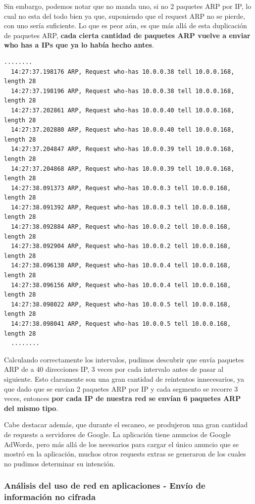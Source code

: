 Sin embargo, podemos notar que no manda uno, si no 2 paquetes ARP por IP, lo cual no esta del todo bien ya que, suponiendo que el request 
ARP no se pierde, con uno sería suficiente. Lo que es peor aún, es que más allá de esta duplicación de paquetes ARP, \textbf{cada cierta cantidad 
de paquetes ARP vuelve a enviar who has a IPs que ya lo había hecho antes}.

\begin{lstlisting}[style=base]
  ........
  14:27:37.198176 ARP, Request who-has 10.0.0.38 tell 10.0.0.168, length 28
  14:27:37.198196 ARP, Request who-has 10.0.0.38 tell 10.0.0.168, length 28
  14:27:37.202861 ARP, Request who-has 10.0.0.40 tell 10.0.0.168, length 28
  14:27:37.202880 ARP, Request who-has 10.0.0.40 tell 10.0.0.168, length 28
  14:27:37.204847 ARP, Request who-has 10.0.0.39 tell 10.0.0.168, length 28
  14:27:37.204868 ARP, Request who-has 10.0.0.39 tell 10.0.0.168, length 28
  14:27:38.091373 ARP, Request who-has 10.0.0.3 tell 10.0.0.168, length 28
  14:27:38.091392 ARP, Request who-has 10.0.0.3 tell 10.0.0.168, length 28
  14:27:38.092884 ARP, Request who-has 10.0.0.2 tell 10.0.0.168, length 28
  14:27:38.092904 ARP, Request who-has 10.0.0.2 tell 10.0.0.168, length 28
  14:27:38.096138 ARP, Request who-has 10.0.0.4 tell 10.0.0.168, length 28
  14:27:38.096156 ARP, Request who-has 10.0.0.4 tell 10.0.0.168, length 28
  14:27:38.098022 ARP, Request who-has 10.0.0.5 tell 10.0.0.168, length 28
  14:27:38.098041 ARP, Request who-has 10.0.0.5 tell 10.0.0.168, length 28
  ........ 
\end{lstlisting}

Calculando correctamente los intervalos, pudimos descubrir que envía paquetes ARP de a 40 direcciones IP, 3 veces por cada intervalo antes 
de pasar al siguiente. Esto claramente son una gran cantidad de reintentos innecesarios, ya que dado que se envían 2 paquetes ARP por IP y 
cada segmento se recorre 3 veces, entonces \textbf{por cada IP de nuestra red se envían 6 paquetes ARP del mismo tipo}. 

Cabe destacar además, que durante el escaneo, se produjeron una gran cantidad de requests a servidores de Google. La aplicación tiene anuncios
de Google AdWords, pero más allá de los necesarios para cargar el único anuncio que se mostró en la aplicación, muchos otros requests extras 
se generaron de los cuales no pudimos determinar su intención.

\subsubsection{Análisis del uso de red en aplicaciones - Envío de información no cifrada}

